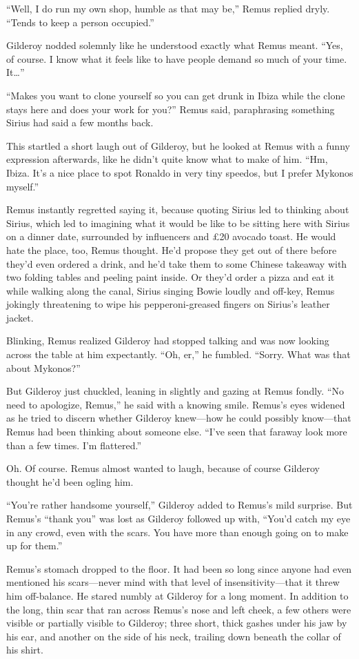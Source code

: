 “Well, I do run my own shop, humble as that may be,” Remus replied dryly. “Tends to keep a person occupied.”

Gilderoy nodded solemnly like he understood exactly what Remus meant. “Yes, of course. I know what it feels like to have people demand so much of your time. It…”

“Makes you want to clone yourself so you can get drunk in Ibiza while the clone stays here and does your work for you?” Remus said, paraphrasing something Sirius had said a few months back.

This startled a short laugh out of Gilderoy, but he looked at Remus with a funny expression afterwards, like he didn’t quite know what to make of him. “Hm, Ibiza. It’s a nice place to spot Ronaldo in very tiny speedos, but I prefer Mykonos myself.”

Remus instantly regretted saying it, because quoting Sirius led to thinking about Sirius, which led to imagining what it would be like to be sitting here with Sirius on a dinner date, surrounded by influencers and £20 avocado toast. He would hate the place, too, Remus thought. He’d propose they get out of there before they’d even ordered a drink, and he’d take them to some Chinese takeaway with two folding tables and peeling paint inside. Or they’d order a pizza and eat it while walking along the canal, Sirius singing Bowie loudly and off-key, Remus jokingly threatening to wipe his pepperoni-greased fingers on Sirius’s leather jacket.

Blinking, Remus realized Gilderoy had stopped talking and was now looking across the table at him expectantly. “Oh, er,” he fumbled. “Sorry. What was that about Mykonos?”

But Gilderoy just chuckled, leaning in slightly and gazing at Remus fondly. “No need to apologize, Remus,” he said with a knowing smile. Remus’s eyes widened as he tried to discern whether Gilderoy knew—how he could possibly know—that Remus had been thinking about someone else. “I’ve seen that faraway look more than a few times. I’m flattered.”

Oh. Of course. Remus almost wanted to laugh, because of course Gilderoy thought he’d been ogling him.

“You’re rather handsome yourself,” Gilderoy added to Remus’s mild surprise. But Remus’s “thank you” was lost as Gilderoy followed up with, “You’d catch my eye in any crowd, even with the scars. You have more than enough going on to make up for them.”

Remus’s stomach dropped to the floor. It had been so long since anyone had even mentioned his scars—never mind with that level of insensitivity—that it threw him off-balance. He stared numbly at Gilderoy for a long moment. In addition to the long, thin scar that ran across Remus’s nose and left cheek, a few others were visible or partially visible to Gilderoy; three short, thick gashes under his jaw by his ear, and another on the side of his neck, trailing down beneath the collar of his shirt.

